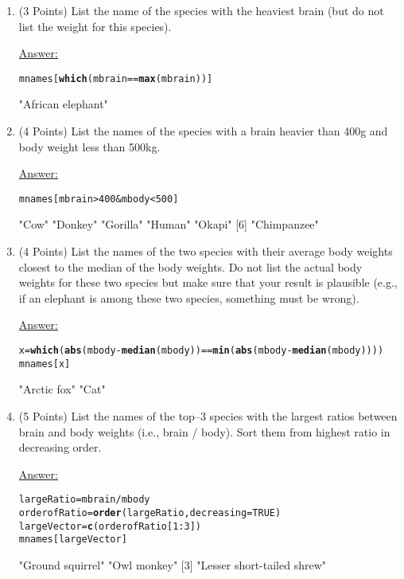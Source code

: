 \documentclass[12pt,letterpaper,final]{article}\usepackage[]{graphicx}\usepackage[]{xcolor}
\makeatletter
\newcommand{\hlnum}[1]{\textcolor[rgb]{0.686,0.059,0.569}{#1}}%
\newcommand{\hlopt}[1]{\textcolor[rgb]{0,0,0}{#1}}%
\newcommand{\hlstd}[1]{\textcolor[rgb]{0.345,0.345,0.345}{#1}}%
\newcommand{\hlkwb}[1]{\textcolor[rgb]{0.69,0.353,0.396}{#1}}%
\newcommand{\hlkwc}[1]{\textcolor[rgb]{0.333,0.667,0.333}{#1}}%
\newcommand{\hlkwd}[1]{\textcolor[rgb]{0.737,0.353,0.396}{\textbf{#1}}}%
\newenvironment{kframe}{%
 \def\at@end@of@kframe{}%
 \ifinner\ifhmode%
  \def\at@end@of@kframe{\end{minipage}}%
  \begin{minipage}{\columnwidth}%
 \fi\fi%
 \def\FrameCommand##1{\hskip\@totalleftmargin \hskip-\fboxsep
 \colorbox{shadecolor}{##1}\hskip-\fboxsep
     \hskip-\linewidth \hskip-\@totalleftmargin \hskip\columnwidth}%
 \MakeFramed {\advance\hsize-\width
   \@totalleftmargin\z@ \linewidth\hsize
   \@setminipage}}%
 {\par\unskip\endMakeFramed%
 \at@end@of@kframe}
\makeatother
\begin{document}
\begin{enumerate}
\begin{enumerate}
\item (3 Points)
List the name of the species with the heaviest brain (but do not list the
weight for this species).

\underline{Answer:}
\begin{kframe}
\begin{alltt}
\hlstd{mnames[}\hlkwd{which} \hlstd{(mbrain} \hlopt{==} \hlkwd{max}\hlstd{(mbrain))]}
\end{alltt}
\end{kframe}[1] "African elephant"



\item (4 Points)
List the names of the species with a brain heavier than 400g and body
weight less than 500kg.

\underline{Answer:}
\begin{kframe}
\begin{alltt}
\hlstd{mnames[mbrain} \hlopt{>} \hlnum{400} \hlopt{&} \hlstd{mbody} \hlopt{<} \hlnum{500}\hlstd{]}
\end{alltt}
\end{kframe}[1] "Cow"        "Donkey"     "Gorilla"    "Human"      "Okapi"     
[6] "Chimpanzee"



\item (4 Points)
List the names of the two species with their average body weights closest
to the median of the body weights. Do not list the actual body weights 
for these two species but make sure that your result is plausible
(e.g., if an elephant is among these two species, something must be wrong).

\underline{Answer:}
\begin{kframe}
\begin{alltt}
\hlstd{x} \hlkwb{=} \hlkwd{which}\hlstd{(}\hlkwd{abs}\hlstd{(mbody} \hlopt{-} \hlkwd{median}\hlstd{(mbody))} \hlopt{==} \hlkwd{min}\hlstd{(}\hlkwd{abs}\hlstd{(mbody}\hlopt{-}\hlkwd{median}\hlstd{(mbody))))}
\hlstd{mnames[x]}
\end{alltt}
\end{kframe}[1] "Arctic fox" "Cat"       



\item (5 Points)
List the names of the top--3 species with the largest ratios between
brain and body weights (i.e., brain / body). Sort them from 
highest ratio in decreasing order.
 
\underline{Answer:}
\begin{kframe}
\begin{alltt}
\hlstd{largeRatio} \hlkwb{=} \hlstd{mbrain}\hlopt{/}\hlstd{mbody}
\hlstd{orderofRatio} \hlkwb{=} \hlkwd{order}\hlstd{(largeRatio,} \hlkwc{decreasing} \hlstd{=} \hlnum{TRUE}\hlstd{)}
\hlstd{largeVector} \hlkwb{=} \hlkwd{c}\hlstd{(orderofRatio[}\hlnum{1}\hlopt{:}\hlnum{3}\hlstd{])}
\hlstd{mnames[largeVector]}
\end{alltt}
\end{kframe}[1] "Ground squirrel"           "Owl monkey"               
[3] "Lesser short-tailed shrew"



\end{enumerate}
\end{enumerate}
\end{document}
